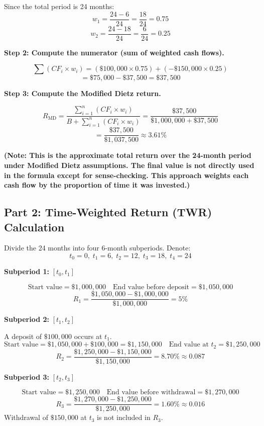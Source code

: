 Since the total period is 24 months:
\[
w_{1} = \frac{24 - 6}{24} = \frac{18}{24} = 0.75
\]
\[
w_{2} = \frac{24 - 18}{24} = \frac{6}{24} = 0.25
\]

\noindent \textbf{Step 2: Compute the numerator (sum of weighted cash flows).}

\[
\sum (CF_{i} \times w_{i}) 
= ( \$100{,}000 \times 0.75 ) + ( -\$150{,}000 \times 0.25 )
\]
\[
= \$75{,}000 - \$37{,}500 
= \$37{,}500
\]

\noindent \textbf{Step 3: Compute the Modified Dietz return.}

\[
R_{\text{MD}} 
= \frac{\sum_{i=1}^{n}(CF_{i} \times w_{i})}
{B + \sum_{i=1}^{n}(CF_{i} \times w_{i})} 
= 
\frac{\$37{,}500}{\$1{,}000{,}000 + \$37{,}500}
\]
\[
= \frac{\$37{,}500}{\$1{,}037{,}500} 
\approx 3.61\%
\]

\noindent \textbf{(Note: This is the approximate total return over the 24-month period under Modified Dietz assumptions. The final value is not directly used in the formula except for sense-checking. This approach weights each cash flow by the proportion of time it was invested.)}

\subsection*{Part 2: Time-Weighted Return (TWR) Calculation}

Divide the 24 months into four 6-month subperiods. Denote:
\[
t_0 = 0,\; t_1 = 6,\; t_2 = 12,\; t_3 = 18,\; t_4 = 24 
\]

\noindent \textbf{Subperiod 1: } \( [t_0, t_1] \)

\[
\text{Start value} = \$1{,}000{,}000 
\quad
\text{End value before deposit} = \$1{,}050{,}000 
\]
\[
R_{1} = \frac{\$1{,}050{,}000 - \$1{,}000{,}000}{\$1{,}000{,}000} = 5\%
\]

\noindent \textbf{Subperiod 2: } \( [t_1, t_2] \)

A deposit of \(\$100{,}000\) occurs at \(t_1\). 
\[
\text{Start value} = \$1{,}050{,}000 + \$100{,}000 = \$1{,}150{,}000 
\quad 
\text{End value at } t_2 = \$1{,}250{,}000
\]
\[
R_{2} 
= \frac{\$1{,}250{,}000 - \$1{,}150{,}000}{\$1{,}150{,}000} 
= 8.70\%
\approx 0.087
\]

\noindent \textbf{Subperiod 3: } \( [t_2, t_3] \)

\[
\text{Start value} = \$1{,}250{,}000 
\quad 
\text{End value before withdrawal} = \$1{,}270{,}000
\]
\[
R_{3} 
= \frac{\$1{,}270{,}000 - \$1{,}250{,}000}{\$1{,}250{,}000} 
= 1.60\%
\approx 0.016
\]
Withdrawal of \(\$150{,}000\) at \(t_3\) is not included in \(R_{3}\). 

